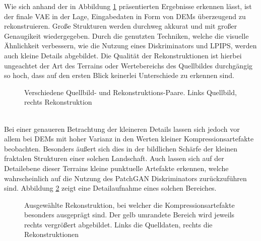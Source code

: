 Wie sich anhand der in Abbildung \ref{fig:vae_recons} präsentierten Ergebnisse erkennen lässt, ist der finale \ac{VAE} in der Lage, Eingabedaten in Form von \ac{DEM}s überzeugend zu rekonstruieren. Große Strukturen werden durchweg akkurat und mit großer Genaugikeit wiedergegeben. Durch die genutzten Techniken, welche die visuelle Ähnlichkeit verbessern, wie die Nutzung eines Diskriminators und \ac{LPIPS}, werden auch kleine Details abgebildet. Die Qualität der Rekonstruktionen ist hierbei ungeachtet der Art des Terrains oder Wertebereichs des Quellbildes durchgängig so hoch, dass auf den ersten Blick keinerlei Unterschiede zu erkennen sind. 
\begin{figure}[htbp]
    \centering

    \vspace{-8pt}

    
    \caption{Verschiedene Quellbild- und Rekonstruktions-Paare. Links Quellbild, rechts Rekonstruktion}
    \label{fig:vae_recons}
\end{figure} \\
Bei einer genaueren Betrachtung der kleineren Details lassen sich jedoch vor allem bei \ac{DEM}s mit hoher Varianz in den Werten kleiner Kompressionsartefakte beobachten. Besonders äußert sich dies in der bildlichen Schärfe der kleinen fraktalen Strukturen einer solchen Landschaft. Auch lassen sich auf der Detailebene dieser Terrains kleine punktuelle Artefakte erkennen, welche wahrscheinlich auf die Nutzung des PatchGAN Diskriminators zurückzuführen sind. Abbildung \ref{fig:vae_artefacts} zeigt eine Detailaufnahme eines solchen Bereiches.
\begin{figure}[htbp]
    \centering
    \caption{Ausgewählte Rekonstruktion, bei welcher die Kompressionsartefakte besonders ausgeprägt sind. Der gelb umrandete Bereich wird jeweils rechts vergrößert abgebildet. Links die Quelldaten, rechts  die Rekonstruktionen}
    \label{fig:vae_artefacts}
\end{figure} \\
